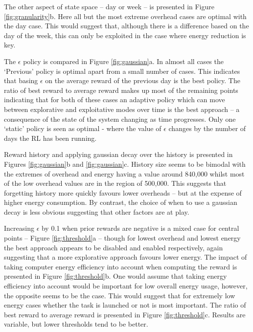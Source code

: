 \documentclass[10pt, conference, compsocconf]{IEEEtran}
\begin{document}
The other aspect of state space -- day or week -- is presented in Figure \ref{fig:granularity}b. Here all but the most extreme overhead cases are optimal with the day case. This would suggest that, although there is a difference based on the day of the week, this can only be exploited in the case where energy reduction is key.
%
%

The $\epsilon$ policy is compared in Figure \ref{fig:gaussian}a. In almost all cases the `Previous' policy is optimal apart from a small number of cases. This indicates that basing $\epsilon$ on the average reward of the previous day is the best policy. The ratio of best reward to average reward makes up most of the remaining points indicating that for both of these cases an adaptive policy which can move between explorative and exploitative modes over time is the best approach -- a consequence of the state of the system changing as time progresses. Only one `static' policy is seen as optimal - where the value of $\epsilon$ changes by the number of days the RL has been running.

Reward history and applying gaussian decay over the history is presented in Figures \ref{fig:gaussian}b and \ref{fig:gaussian}c. History size seems to be bimodal with the extremes of overhead and energy  having a value around 840,000 whilst most of the low overhead values are in the region of 500,000. This suggests that forgetting history more quickly favours lower overheads -- but at the expense of higher energy consumption. By contrast, the choice of when to use a gaussian decay is less obvious suggesting that other factors are at play. 

Increasing $\epsilon$ by 0.1 when prior rewards are negative is a mixed case for central points -- Figure \ref{fig:threshold}a -- though for lowest overhead and lowest energy the best approach appears to be disabled and enabled respectively, again suggesting that a more explorative approach favours lower energy. The impact of taking computer energy efficiency into account when computing the reward is presented in Figure \ref{fig:threshold}b. One would assume that taking energy efficiency into account would be important for low overall energy usage, however, the opposite seems to be the case. This would suggest that for extremely low energy cases whether the task is launched or not is most important. The ratio of best reward to average reward is presented in Figure \ref{fig:threshold}c. Results are variable, but lower thresholds tend to be better.
\end{document}
